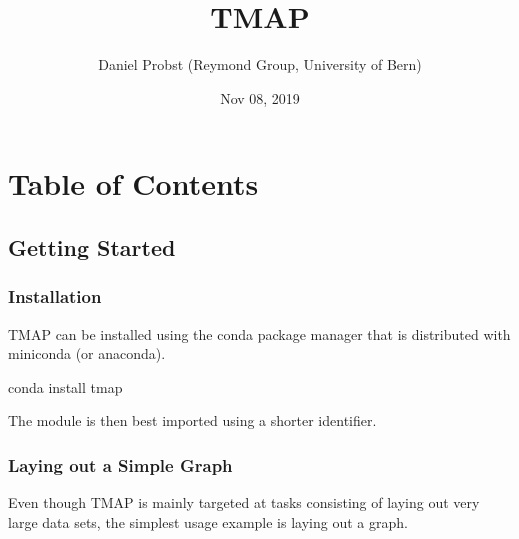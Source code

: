 \documentclass[letterpaper,10pt,english]{sphinxmanual}
\title{TMAP}
\date{Nov 08, 2019}
\author{Daniel Probst (Reymond Group, University of Bern)}
\begin{document}
\pagestyle{empty}
\sphinxmaketitle
\pagestyle{plain}
\sphinxtableofcontents
\pagestyle{normal}
\label{\detokenize{index::doc}}



\chapter{Table of Contents}
\label{\detokenize{index:table-of-contents}}

\section{Getting Started}
\label{\detokenize{tutorial:getting-started}}\label{\detokenize{tutorial::doc}}

\subsection{Installation}
\label{\detokenize{tutorial:installation}}
TMAP can be installed using the conda package manager that
is distributed with miniconda (or anaconda).

\begin{sphinxVerbatim}[commandchars=\\\{\}]
conda install tmap
\end{sphinxVerbatim}

The module is then best imported using a shorter identifier.

\begin{sphinxVerbatim}[commandchars=\\\{\}]
   
\end{sphinxVerbatim}


\subsection{Laying out a Simple Graph}
\label{\detokenize{tutorial:laying-out-a-simple-graph}}
Even though TMAP is mainly targeted at tasks consisting of
laying out very large data sets, the simplest usage example
is laying out a graph.
\end{document}
